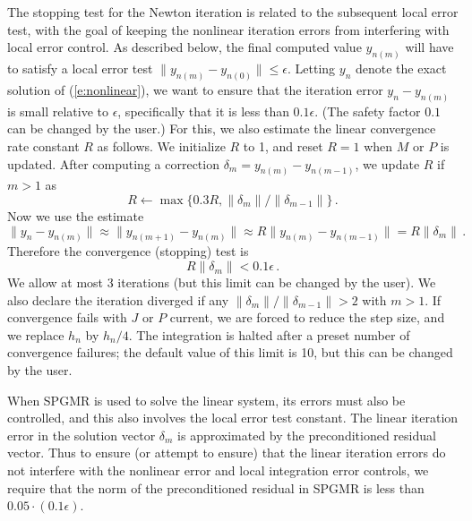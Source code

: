 The stopping test for the Newton iteration is related to the
subsequent local error test, with the goal of keeping the nonlinear
iteration errors from interfering with local error control.  As
described below, the final computed value $y_{n(m)}$ will have to
satisfy a local error test $\|y_{n(m)} - y_{n(0)}\| \leq \epsilon$.
Letting $y_n$ denote the exact solution of (\ref{e:nonlinear}), we want
to ensure that the iteration error $y_n - y_{n(m)}$ is small relative
to $\epsilon$, specifically that it is less than $0.1 \epsilon$.
(The safety factor $0.1$ can be changed by the user.)  For this, we
also estimate the linear convergence rate constant $R$ as follows.
We initialize $R$ to 1, and reset $R = 1$ when $M$ or $P$ is updated.
After computing a correction $\delta_m = y_{n(m)}-y_{n(m-1)}$, we
update $R$ if $m > 1$ as
\begin{equation*}
  R \leftarrow \max\{0.3R , \|\delta_m\| / \|\delta_{m-1}\| \} \, . 
\end{equation*}
Now we use the estimate
\begin{equation*}
  \| y_n - y_{n(m)} \| \approx \| y_{n(m+1)} - y_{n(m)} \| 
  \approx R \| y_{n(m)} - y_{n(m-1)} \|  =  R \|\delta_m \| \, . 
\end{equation*}
Therefore the convergence (stopping) test is 
\begin{equation*}
  R \|\delta_m \| < 0.1 \epsilon \, .
\end{equation*}
We allow at most 3 iterations (but this limit can be changed by the
user).  We also declare the iteration diverged if any $\|\delta_m\| /
\|\delta_{m-1}\| > 2$ with $m > 1$. If convergence fails with $J$ or
$P$ current, we are forced to reduce the step size, and we replace
$h_n$ by $h_n/4$.  The integration is halted after a preset number
of convergence failures; the default value of this limit is 10, 
but this can be changed by the user.

When SPGMR is used to solve the linear system, its errors must also be
controlled, and this also involves the local error test constant.  The
linear iteration error in the solution vector $\delta_m$ is
approximated by the preconditioned residual vector.  Thus to ensure
(or attempt to ensure) that the linear iteration errors do not
interfere with the nonlinear error and local integration error
controls, we require that the norm of the preconditioned residual
in SPGMR is less than $0.05 \cdot (0.1 \epsilon)$.

